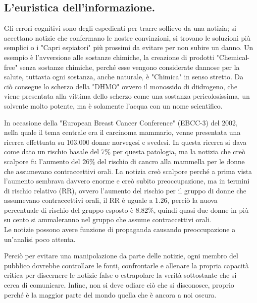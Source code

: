 \documentclass[a4paper]{article}
\begin{document}
\subsection{L'euristica dell'informazione.}
Gli errori cognitivi sono degli espedienti per trarre sollievo da una notizia; si accettano notizie che confermano le nostre convinzioni, si trovano le soluzioni più semplici o i "Capri espiatori" più prossimi da evitare per non subire un danno.
Un esempio è l'avversione alle sostanze chimiche, la creazione di prodotti "Chemical-free" senza sostanze chimiche, perché esse vengono considerate dannose per la salute, tuttavia ogni sostanza, anche naturale, è "Chimica" in senso stretto.
Da ciò consegue lo scherzo della "DHMO" ovvero il monossido di diidrogeno, che viene presentata alla vittima dello scherzo come una sostanza pericolosissima, un solvente molto potente, ma è solamente l'acqua con un nome scientifico.

In occasione della  "European Breast Cancer Conference" (EBCC-3) del 2002, nella quale il tema centrale era il carcinoma mammario, venne presentata una ricerca effettuata su 103.000 donne norvegesi e svedesi.
In questa ricerca si dava come dato un rischio basale del 7\% per questa patologia, ma la notizia che creò scalpore fu l'aumento del 26\% del rischio di cancro alla mammella per le donne che assumevano contraccettivi orali.
La notizia creò scalpore perché a prima vista l'aumento sembrava davvero enorme e creò subito preoccupazione, ma in termini di rischio relativo (RR), ovvero l'aumento del rischio per il gruppo di donne che assumevano contraccettivi orali, il RR è uguale a 1.26, perciò la nuova percentuale di rischio del gruppo esposto è 8.82\%, quindi quasi due donne in più su cento si ammaleranno nel gruppo che assume contraccettivi orali.\\ Le notizie possono avere funzione di propaganda causando preoccupazione a un'analisi poco attenta.

Perciò per evitare una manipolazione da parte delle notizie, ogni membro del pubblico dovrebbe controllare le fonti, confrontarle e allenare la propria capacità
critica per discernere le notizie false o estrapolare la verità sottostante che si cerca di comunicare. Infine, non si deve odiare ciò che si disconosce, proprio perché è la maggior parte del mondo quella che è ancora a noi oscura.
\end{document}
